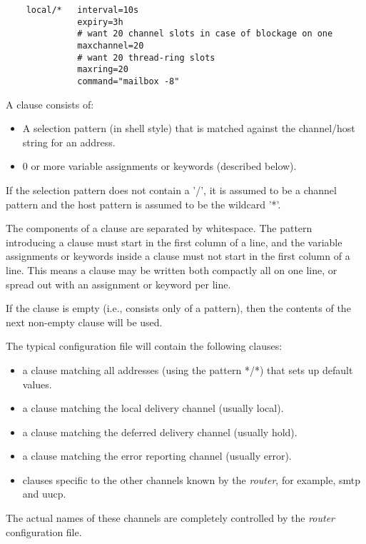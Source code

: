 \begin{verbatim}
    local/*   interval=10s
              expiry=3h
              # want 20 channel slots in case of blockage on one
              maxchannel=20
              # want 20 thread-ring slots
              maxring=20
              command="mailbox -8"
\end{verbatim}

A clause consists of:

\begin{itemize}
\item A selection pattern  (in  shell style) that  is
matched  against        the  channel/host  string  for an
address.
\item 0  or more  variable assignments or keywords
(described below).
\end{itemize}


If the selection pattern does not contain a '/', it is
assumed to be a channel pattern and the host  pattern  is
assumed to be the wildcard '*'.

The components of a clause are separated by whitespace.
The pattern introducing a clause must start in the first
column of a line, and the variable assignments or keywords
inside a clause must not start in the first  column of a
line. This means a clause may be written both compactly
all on one line, or spread out with an assignment or keyword per line.

If the clause is empty (i.e., consists only of a pattern),
then the contents of the next non-empty clause will be used.

The typical configuration file will contain the following clauses:
\begin{itemize}
\item a clause matching all addresses (using the pattern */*) that sets 
up default values.
\item a  clause  matching  the  local delivery channel
(usually local).
\item a clause matching the deferred    delivery  channel
(usually hold).
\item a  clause  matching  the error reporting channel
(usually error).
\item clauses specific to the other channels    known  by
the {\em router\/}, for example, smtp and uucp.
\end{itemize}


The  actual  names  of  these channels are completely 
controlled by the {\em router\/} configuration file.

